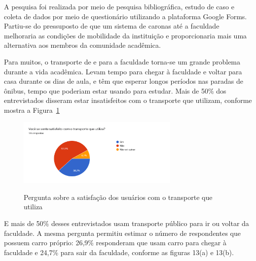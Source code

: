 A pesquisa foi realizada por meio de pesquisa bibliográfica, estudo de caso e coleta de dados por meio de questionário utilizando a plataforma Google Forms. Partiu-se do pressuposto de que um sistema de caronas até a faculdade melhoraria as condições de mobilidade da instituição e proporcionaria mais uma alternativa aos membros da comunidade acadêmica.

Para muitos, o transporte de e para a faculdade torna-se um grande problema durante a vida acadêmica. Levam tempo para chegar à faculdade e voltar para casa durante os dias de aula, e têm que esperar longos períodos nas paradas de ônibus, tempo que poderiam estar usando para estudar. Mais de 50\% dos entrevistados disseram estar insatisfeitos com o transporte que utilizam, conforme mostra a Figura~\ref{fig:satisfacao}

\begin{figure}[H]
	\centering
	\caption{Pergunta sobre a satisfação dos usuários com o transporte que utiliza}
	\includegraphics[width=0.7\textwidth]{./04-figuras/questionario/6.png}
	\label{fig:satisfacao}
\end{figure}

E mais de 50\% desses entrevistados usam transporte público para ir ou voltar da faculdade. A mesma pergunta permitiu estimar o número de respondentes que possuem carro próprio: 26,9\% responderam que usam carro para chegar à faculdade e 24,7\% para sair da faculdade, conforme as figuras 13(a) e 13(b).

